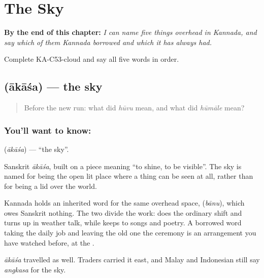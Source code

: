 
\chapter{The Sky}
\label{ch:ka-sky}

\begin{chapteropening}
\textbf{By the end of this chapter:} \emph{I can name five things overhead in Kannada, and say which of them Kannada borrowed and which it has always had.}

Complete KA-C53-cloud and say all five words in order.
\end{chapteropening}

\section[\texorpdfstring{\kn{ಆಕಾಶ} (ākāśa)}{ಆಕಾಶ (ākāśa)}]{ (ākāśa) — the sky}

\label{lesson:KA-C53-sky}



\begin{quote}
Before the new run: what did \emph{hūvu} mean, and what did \emph{hūmāle} mean?
\end{quote}

\subsection*{You'll want to know: }
\textbf{} (\emph{ākāśa}) — \textquotedblleft{}the sky\textquotedblright{}.

Sanskrit \emph{ākāśa}, built on a piece meaning \textquotedblleft{}to shine, to be visible\textquotedblright{}. The sky is named for being the open lit place where a thing can be seen at all, rather than for being a lid over the world.

Kannada holds an inherited word for the same overhead space,  (\emph{bānu}), which owes Sanskrit nothing. The two divide the work:  does the ordinary shift and turns up in weather talk, while  keeps to songs and poetry. A borrowed word taking the daily job and leaving the old one the ceremony is an arrangement you have watched before, at the .

\emph{ākāśa} travelled as well. Traders carried it east, and Malay and Indonesian still say \emph{angkasa} for the sky.


